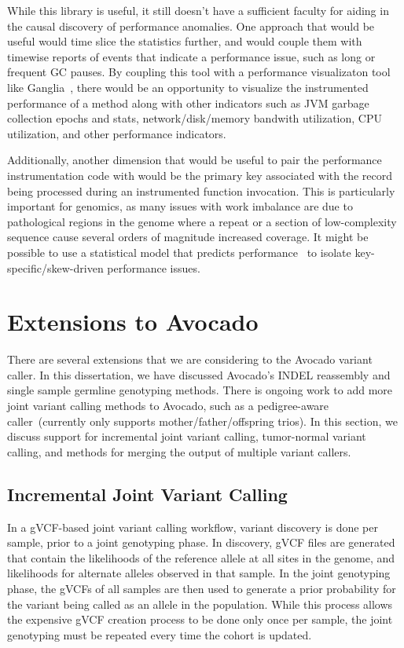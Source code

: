 \documentclass[phd]{ucbthesis}
\begin{document}
While this library is useful, it still doesn't have a sufficient faculty for
aiding in the causal discovery of performance anomalies. One approach that would
be useful would time slice the statistics further, and would couple them with
timewise reports of events that indicate a performance issue, such as long or
frequent GC pauses. By coupling this tool with a performance visualizaton
tool like {Ganglia}~\cite{massie04}, there would be an opportunity to
visualize the instrumented performance of a method along with other indicators
such as JVM garbage collection epochs and stats, network/disk/memory bandwith
utilization, CPU utilization, and other performance indicators.

Additionally, another dimension that would be useful to pair the performance
instrumentation code with would be the primary key associated with the record
being processed during an instrumented function invocation. This is particularly
important for genomics, as many issues with work imbalance are due to pathological
regions in the genome where a repeat or a section of low-complexity sequence
cause several orders of magnitude increased coverage. It might be possible to use a
statistical model that predicts performance~\cite{venkataraman16ernest} to isolate
key-specific/skew-driven performance issues.

\section{Extensions to {Avocado}}
\label{sec:extending-avocado}

There are several extensions that we are considering to the {Avocado}
variant caller. In this dissertation, we have discussed {Avocado}'s
INDEL reassembly and single sample germline genotyping methods. There is ongoing
work to add more joint variant calling methods to {Avocado}, such as a
pedigree-aware caller~(currently only supports mother/father/offspring trios).
In this section, we discuss support for incremental joint variant calling,
tumor-normal variant calling, and methods for merging the output of multiple
variant callers.

\subsection{Incremental Joint Variant Calling}
\label{sec:incremental-joint-variant-calling}

In a gVCF-based joint variant calling workflow, variant discovery is done per
sample, prior to a joint genotyping phase. In discovery, gVCF files are
generated that contain the likelihoods of the reference allele at all sites in
the genome, and likelihoods for alternate alleles observed in that sample. In
the joint genotyping phase, the gVCFs of all samples are then used to generate
a prior probability for the variant being called as an allele in the population.
While this process allows the expensive gVCF creation process to be done only
once per sample, the joint genotyping must be repeated every time the cohort is
updated.
\end{document}
